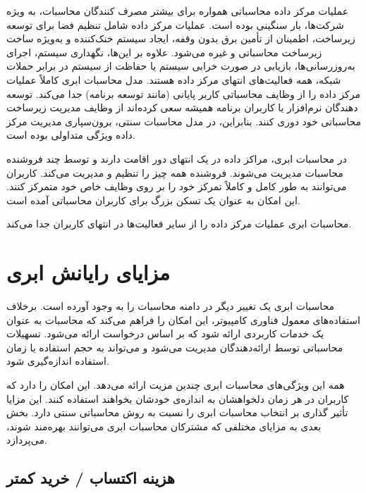 \documentclass{book}
\begin{document}
            عملیات مرکز داده محاسباتی همواره برای بیشتر مصرف کنندگان محاسبات، به ویژه شرکت‌ها، بار سنگینی بوده است. عملیات مرکز داده شامل تنظیم فضا برای توسعه زیرساخت، اطمینان از تأمین برق بدون وقفه، ایجاد سیستم خنک‌کننده و به‌ویژه ساخت زیرساخت محاسباتی و غیره می‌شود. علاوه بر این‌ها، نگهداری سیستم، اجرای به‌روزرسانی‌ها، بازیابی در صورت خرابی سیستم یا حفاظت از سیستم در برابر حملات شبکه، همه فعالیت‌های انتهای مرکز داده هستند. مدل محاسبات ابری کاملاً عملیات مرکز داده را از وظایف محاسباتی کاربر پایانی (مانند توسعه برنامه) جدا می‌کند. توسعه دهندگان نرم‌افزار یا کاربران برنامه همیشه سعی کرده‌اند از وظایف مدیریت زیرساخت محاسباتی خود دوری کنند. بنابراین، در مدل محاسبات سنتی، برون‌سپاری مدیریت مرکز داده ویژگی متداولی بوده است.

            در محاسبات ابری، مراکز داده در یک انتهای دور اقامت دارند و توسط چند فروشنده محاسبات مدیریت می‌شوند. فروشنده همه چیز را تنظیم و مدیریت می‌کند. کاربران می‌توانند به طور کامل و کاملاً تمرکز خود را بر روی وظایف خاص خود متمرکز کنند. این امکان به عنوان یک تسکن بزرگ برای کاربران محاسباتی آمده است.

            \begin{addinfo}
                
                محاسبات ابری عملیات مرکز داده را از سایر فعالیت‌ها در انتهای کاربران جدا می‌کند.

            \end{addinfo}

        \section{مزایای رایانش ابری}

            محاسبات ابری یک تغییر دیگر در دامنه محاسبات را به وجود آورده است. برخلاف استفاده‌های معمول فناوری کامپیوتر، این امکان را فراهم می‌کند که محاسبات به عنوان یک خدمات کاربردی ارائه شود که بر اساس درخواست ارائه می‌شود. تسهیلات محاسباتی توسط ارائه‌دهندگان مدیریت می‌شود و می‌تواند به حجم استفاده یا زمان استفاده اندازه‌گیری شود.

            همه این ویژگی‌های محاسبات ابری چندین مزیت ارائه می‌دهد. این امکان را دارد که کاربران در هر زمان دلخواهشان به اندازه‌ی خودشان بخواهند استفاده کنند. این مزایا تأثیر گذاری بر انتخاب محاسبات ابری را نسبت به روش محاسباتی سنتی دارد. بخش بعدی به مزایای مختلفی که مشترکان محاسبات ابری می‌توانند بهره‌مند شوند، می‌پردازد.

            \subsection{هزینه اکتساب / خرید کمتر}
\end{document}
